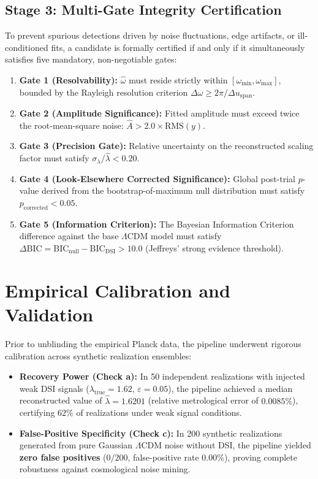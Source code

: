 \documentclass[10pt,twocolumn,a4paper]{article}
\begin{document}
\subsection{Stage 3: Multi-Gate Integrity Certification}
To prevent spurious detections driven by noise fluctuations, edge artifacts, or ill-conditioned fits, a candidate is formally certified if and only if it simultaneously satisfies five mandatory, non-negotiable gates:
\begin{enumerate}
    \item \textbf{Gate 1 (Resolvability):} $\hat\omega$ must reside strictly within $[\omega_{\min}, \omega_{\max}]$, bounded by the Rayleigh resolution criterion $\Delta\omega \ge 2\pi / \Delta u_{\mathrm{span}}$.
    \item \textbf{Gate 2 (Amplitude Significance):} Fitted amplitude must exceed twice the root-mean-square noise: $\hat A > 2.0 \times \mathrm{RMS}(y)$.
    \item \textbf{Gate 3 (Precision Gate):} Relative uncertainty on the reconstructed scaling factor must satisfy $\sigma_\lambda / \hat\lambda < 0.20$.
    \item \textbf{Gate 4 (Look-Elsewhere Corrected Significance):} Global post-trial $p$-value derived from the bootstrap-of-maximum null distribution must satisfy $p_{\mathrm{corrected}} < 0.05$.
    \item \textbf{Gate 5 (Information Criterion):} The Bayesian Information Criterion difference against the base $\Lambda$CDM model must satisfy $\Delta\mathrm{BIC} = \mathrm{BIC}_{\mathrm{null}} - \mathrm{BIC}_{\mathrm{DSI}} > 10.0$ (Jeffreys' strong evidence threshold).
\end{enumerate}

\section{Empirical Calibration and Validation}
Prior to unblinding the empirical Planck data, the pipeline underwent rigorous calibration across synthetic realization ensembles:
\begin{itemize}
    \item \textbf{Recovery Power (Check a):} In 50 independent realizations with injected weak DSI signals ($\lambda_{\mathrm{true}} = 1.62$, $\varepsilon = 0.05$), the pipeline achieved a median reconstructed value of $\hat\lambda = 1.6201$ (relative metrological error of $0.0085\%$), certifying $62\%$ of realizations under weak signal conditions.
    \item \textbf{False-Positive Specificity (Check c):} In 200 synthetic realizations generated from pure Gaussian $\Lambda$CDM noise without DSI, the pipeline yielded \textbf{zero false positives} ($0/200$, false-positive rate $0.00\%$), proving complete robustness against cosmological noise mining.
\end{itemize}
\end{document}
